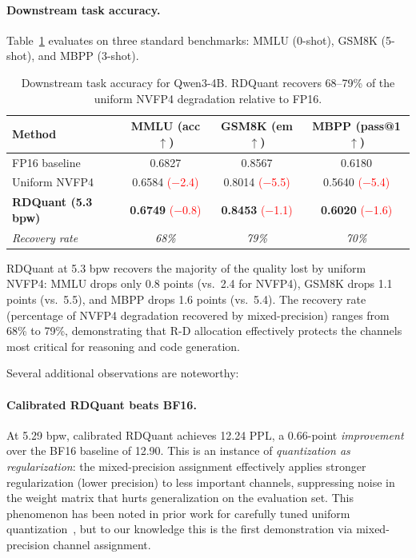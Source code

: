 \documentclass{article}
\begin{document}
\paragraph{Downstream task accuracy.}
Table~\ref{tab:downstream} evaluates on three standard benchmarks: MMLU (0-shot), GSM8K (5-shot), and MBPP (3-shot).

\begin{table}[t]
\centering
\caption{Downstream task accuracy for Qwen3-4B. RDQuant recovers 68--79\% of the uniform NVFP4 degradation relative to FP16.}
\label{tab:downstream}
\begin{tabular}{lccc}
\toprule
\textbf{Method} & \textbf{MMLU} (acc$\uparrow$) & \textbf{GSM8K} (em$\uparrow$) & \textbf{MBPP} (pass@1$\uparrow$) \\
\midrule
FP16 baseline       & 0.6827 & 0.8567 & 0.6180 \\
Uniform NVFP4       & 0.6584 \textcolor{red}{($-$2.4)} & 0.8014 \textcolor{red}{($-$5.5)} & 0.5640 \textcolor{red}{($-$5.4)} \\
\textbf{RDQuant (5.3 bpw)} & \textbf{0.6749} \textcolor{red}{($-$0.8)} & \textbf{0.8453} \textcolor{red}{($-$1.1)} & \textbf{0.6020} \textcolor{red}{($-$1.6)} \\
\midrule
\textit{Recovery rate} & \textit{68\%} & \textit{79\%} & \textit{70\%} \\
\bottomrule
\end{tabular}
\end{table}

RDQuant at 5.3 bpw recovers the majority of the quality lost by uniform NVFP4:
MMLU drops only 0.8 points (vs.\ 2.4 for NVFP4), GSM8K drops 1.1 points (vs.\ 5.5), and MBPP drops 1.6 points (vs.\ 5.4).
The recovery rate (percentage of NVFP4 degradation recovered by mixed-precision) ranges from 68\% to 79\%, demonstrating that R-D allocation effectively protects the channels most critical for reasoning and code generation.

Several additional observations are noteworthy:

\paragraph{Calibrated RDQuant beats BF16.}
At 5.29 bpw, calibrated RDQuant achieves 12.24 PPL, a 0.66-point \emph{improvement} over the BF16 baseline of 12.90.
This is an instance of \emph{quantization as regularization}: the mixed-precision assignment effectively applies stronger regularization (lower precision) to less important channels, suppressing noise in the weight matrix that hurts generalization on the evaluation set.
This phenomenon has been noted in prior work for carefully tuned uniform quantization~\cite{nagel2020up}, but to our knowledge this is the first demonstration via mixed-precision channel assignment.
\end{document}
